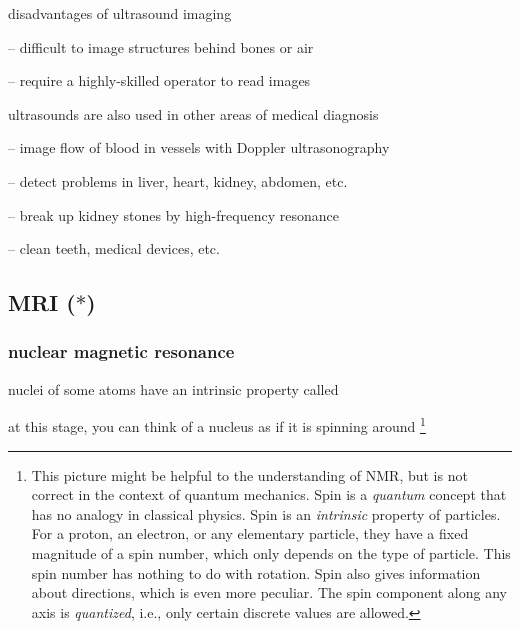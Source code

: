 \cmt disadvantages of ultrasound imaging

\begin{compactitem}
	\item[--] difficult to image structures behind bones or air
	
	\item[--] require a highly-skilled operator to read images
\end{compactitem}
	
\cmt ultrasounds are also used in other areas of medical diagnosis
	
\begin{compactitem}
	\item[--] image flow of blood in vessels with Doppler ultrasonography
	
	\item[--] detect problems in liver, heart, kidney, abdomen, etc.
	
	\item[--] break up kidney stones by high-frequency resonance
	
	\item[--] clean teeth, medical devices, etc.
\end{compactitem}




\subsection{\texorpdfstring{MRI ($\ast$)}{MRI}}

\subsubsection{nuclear magnetic resonance}

nuclei of some atoms have an intrinsic property called 

at this stage, you can think of a nucleus as if it is spinning around
\footnote{This picture might be helpful to the understanding of NMR, but is not correct in the context of quantum mechanics. Spin is a \emph{quantum} concept that has no analogy in classical physics. Spin is an \emph{intrinsic} property of particles. For a proton, an electron, or any elementary particle, they have a fixed magnitude of a spin number, which only depends on the type of particle. This spin number has nothing to do with rotation. Spin also gives information about directions, which is even more peculiar. The spin component along any axis is \emph{quantized}, i.e., only certain discrete values are allowed.}

